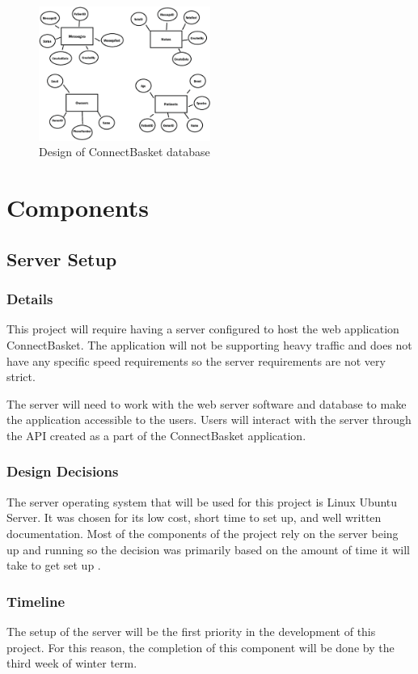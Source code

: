\documentclass[onecolumn, draftclsnofoot,10pt, compsoc]{IEEEtran}
\begin{document}
\begin{figure}[h!]
  \includegraphics[width=0.5\textwidth]{database_design}
  \caption{Design of ConnectBasket database}
\end{figure}


\section{Components}

\subsection{Server Setup}

\subsubsection{Details}
This project will require having a server configured to host the web application ConnectBasket. The application will not be supporting heavy traffic and does not have any specific speed requirements so the server requirements are not very strict.

The server will need to work with the web server software and database to make the application accessible to the users.  Users will interact with the server through the API created as a part of the ConnectBasket application.


\subsubsection{Design Decisions}
The server operating system that will be used for this project is Linux Ubuntu Server. It was chosen for its low cost, short time to set up, and well written documentation. Most of the components of the project rely on the server being up and running so the decision was primarily based on the amount of time it will take to get set up \cite{ubuntu}.


\subsubsection{Timeline}
The setup of the server will be the first priority in the development of this project. For this reason, the completion of this component will be done by the third week of winter term.
\end{document}
